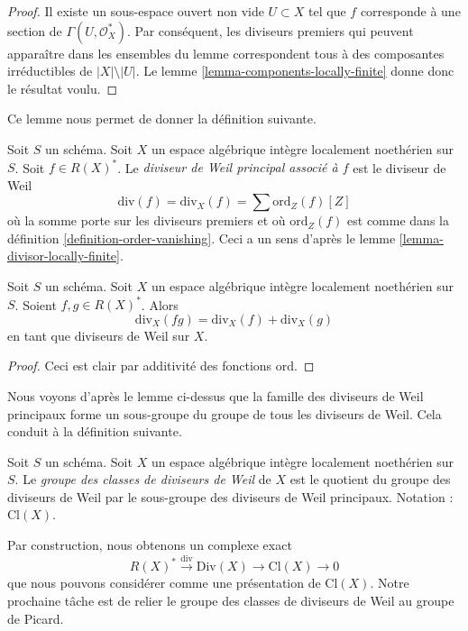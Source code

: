 \begin{proof}
Il existe un sous-espace ouvert non vide $U \subset X$
tel que $f$ corresponde à une section de $\Gamma(U, \mathcal{O}_X^*)$.
Par conséquent, les diviseurs premiers qui peuvent apparaître dans les ensembles du lemme
correspondent tous à des composantes irréductibles de $|X| \setminus |U|$.
Le lemme \ref{lemma-components-locally-finite} donne donc le résultat voulu.
\end{proof}

\noindent
Ce lemme nous permet de donner la définition suivante.

\begin{definition}
\label{definition-principal-divisor}
Soit $S$ un schéma.
Soit $X$ un espace algébrique intègre localement noethérien sur $S$.
Soit $f \in R(X)^*$.
Le {\it diviseur de Weil principal associé à $f$} est le diviseur de Weil
$$
\text{div}(f) = \text{div}_X(f) = \sum \text{ord}_Z(f) [Z]
$$
où la somme porte sur les diviseurs premiers et où $\text{ord}_Z(f)$ est comme dans
la définition \ref{definition-order-vanishing}. Ceci a un sens
d'après le lemme \ref{lemma-divisor-locally-finite}.
\end{definition}

\begin{lemma}
\label{lemma-div-additive}
Soit $S$ un schéma.
Soit $X$ un espace algébrique intègre localement noethérien sur $S$.
Soient $f, g \in R(X)^*$. Alors
$$
\text{div}_X(fg) = \text{div}_X(f) + \text{div}_X(g)
$$
en tant que diviseurs de Weil sur $X$.
\end{lemma}

\begin{proof}
Ceci est clair par additivité des fonctions $\text{ord}$.
\end{proof}

\noindent
Nous voyons d'après le lemme ci-dessus que la famille des diviseurs de Weil principaux
forme un sous-groupe du groupe de tous les diviseurs de Weil. Cela conduit à la
définition suivante.

\begin{definition}
\label{definition-class-group}
Soit $S$ un schéma.
Soit $X$ un espace algébrique intègre localement noethérien sur $S$. Le
{\it groupe des classes de diviseurs de Weil} de $X$ est le quotient du
groupe des diviseurs de Weil par le sous-groupe des diviseurs de Weil principaux.
Notation : $\text{Cl}(X)$.
\end{definition}

\noindent
Par construction, nous obtenons un complexe exact
\begin{equation}
\label{equation-Weil-divisor-class}
R(X)^* \xrightarrow{\text{div}} \text{Div}(X) \to \text{Cl}(X) \to 0
\end{equation}
que nous pouvons considérer comme une présentation de $\text{Cl}(X)$. Notre prochaine tâche
est de relier le groupe des classes de diviseurs de Weil au groupe de Picard.

